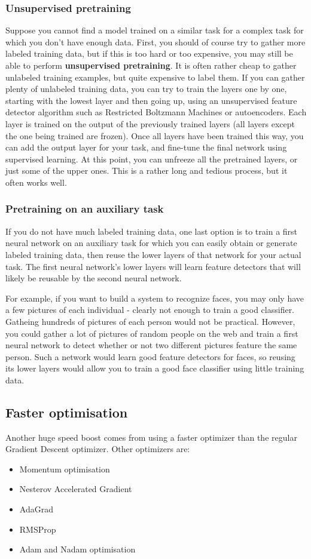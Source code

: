 \documentclass[12pt, letterpaper]{article}
\theoremstyle{definition}
\let\tb\textbf
\begin{document}
\subsubsection{Unsupervised pretraining}
Suppose you cannot find a model trained on a similar task for a complex task for which you don't have enough data. First, you should of course try to gather more labeled training data, but if this is too hard or too expensive, you may still be able to perform \tb{unsupervised pretraining}.  It is often rather cheap to gather unlabeled training examples, but quite expensive to label them. If you can gather plenty of unlabeled training data, you can try to train the layers one by one, starting with the lowest layer and then going up, using an unsupervised feature detector algorithm such as Restricted Boltzmann Machines or autoencoders. Each layer is trained on the output of the previously trained layers (all layers except the one being trained are frozen). Once all layers have been trained this way, you can add the output layer for your task, and fine-tune the final network using supervised learning. At this point, you can unfreeze all the pretrained layers, or just some of the upper ones. This is a rather long and tedious process, but it often works well.

\subsubsection{Pretraining on an auxiliary task}
If you do not have much labeled training data, one last option is to train a first neural network on an auxiliary task for which you can easily obtain or generate labeled training data, then reuse the lower layers of that network for your actual task. The first neural network's lower layers will learn feature detectors that will likely be reusable by the second neural network.

For example, if you want to build a system to recognize faces, you may only have a few pictures of each individual - clearly not enough to train a good classifier. Gatheing hundreds of pictures of each person would not be practical. However, you could gather a lot of pictures of random people on the web and train a first neural network to detect whether or not two different pictures feature the same person. Such a network would learn good feature detectors for faces, so reusing its lower layers would allow you to train a good face classifier using little training data.

\subsection{Faster optimisation}
Another huge speed boost comes from using a faster optimizer than the regular Gradient Descent optimizer. Other optimizers are:
\begin{itemize}
\item Momentum optimisation
\item Nesterov Accelerated Gradient
\item AdaGrad
\item RMSProp
\item Adam and Nadam optimisation
\end{itemize}
\end{document}
